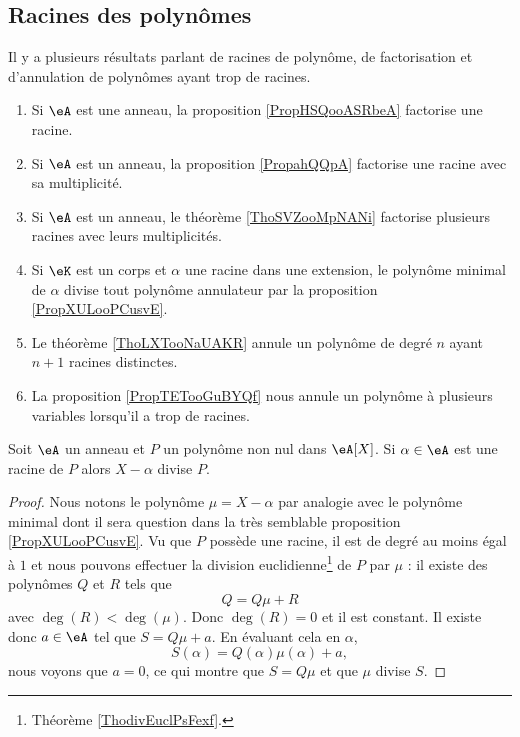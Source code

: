\subsection{Racines des polynômes}

Il y a plusieurs résultats parlant de racines de polynôme, de factorisation et d'annulation de polynômes ayant trop de racines.
\begin{enumerate}
    \item
        Si \( \eA\) est une anneau, la proposition \ref{PropHSQooASRbeA} factorise une racine.
    \item
        Si \( \eA\) est un anneau, la proposition \ref{PropahQQpA} factorise une racine avec sa multiplicité.
    \item
        Si \( \eA\) est un anneau, le théorème \ref{ThoSVZooMpNANi} factorise plusieurs racines avec leurs multiplicités.
    \item
        Si \( \eK\) est un corps et \( \alpha\) une racine dans une extension, le polynôme minimal de \( \alpha\) divise tout polynôme annulateur par la proposition \ref{PropXULooPCusvE}.
    \item
        Le théorème \ref{ThoLXTooNaUAKR} annule un polynôme de degré \( n\) ayant \( n+1\) racines distinctes.
    \item
        La proposition \ref{PropTETooGuBYQf} nous annule un polynôme à plusieurs variables lorsqu'il a trop de racines.
\end{enumerate}

\begin{proposition} \label{PropHSQooASRbeA}
    Soit \( \eA\) un anneau et \( P\) un polynôme non nul dans \( \eA[X]\). Si \( \alpha\in \eA\) est une racine de \( P\) alors \( X-\alpha\) divise \( P\).
\end{proposition}

\begin{proof}
    Nous notons le polynôme \( \mu=X-\alpha\) par analogie avec le polynôme minimal dont il sera question dans la très semblable proposition \ref{PropXULooPCusvE}. 
    Vu que \( P\) possède une racine, il est de degré au moins égal à \( 1\) et nous pouvons effectuer la division euclidienne\footnote{Théorème \ref{ThodivEuclPsFexf}.} de \( P\) par \( \mu\) : il existe des polynômes \( Q\) et \( R\) tels que
    \begin{equation}
        Q=Q\mu+R
    \end{equation}
    avec \( \deg(R)<\deg(\mu)\). Donc \( \deg(R)=0\) et il est constant. Il existe donc \( a\in \eA\) tel que \( S=Q\mu+a\). En évaluant cela en \( \alpha\),
    \begin{equation}
        S(\alpha)=Q(\alpha)\mu(\alpha)+a,
    \end{equation}
    nous voyons que \( a=0\), ce qui montre que \( S=Q\mu\) et que \( \mu\) divise \( S\).
\end{proof}

